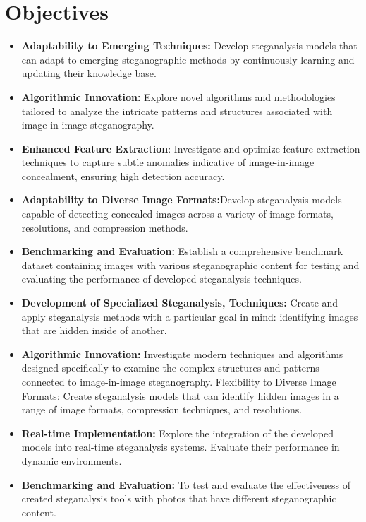\section{Objectives}
\begin{itemize}
\item \textbf{Adaptability to Emerging Techniques:} Develop steganalysis models that can adapt to emerging steganographic methods by continuously learning and updating their knowledge base.
\item \textbf{Algorithmic Innovation:} Explore novel algorithms and methodologies tailored to analyze the intricate patterns and structures associated with image-in-image steganography.
\item \textbf{Enhanced Feature Extraction}: Investigate and optimize feature extraction techniques to capture subtle anomalies indicative of image-in-image concealment, ensuring high detection accuracy.
\item \textbf{Adaptability to Diverse Image Formats:}Develop steganalysis models capable of detecting concealed images across a variety of image formats, resolutions, and compression methods.
\item \textbf{Benchmarking and Evaluation:} Establish a comprehensive benchmark dataset containing images with various steganographic content for testing and evaluating the performance of developed steganalysis techniques.
\item \textbf{Development of Specialized Steganalysis, Techniques:} Create and apply steganalysis methods with a particular goal in mind: identifying images that are hidden inside of another.
\item \textbf{Algorithmic Innovation:} Investigate modern techniques and algorithms designed specifically to examine the complex structures and patterns connected to image-in-image steganography.
Flexibility to Diverse Image Formats: Create steganalysis models that can identify hidden images in a range of image formats, compression techniques, and resolutions.
\item \textbf{Real-time Implementation:} Explore the integration of the developed models into real-time steganalysis systems. Evaluate their performance in dynamic environments.
\item \textbf{Benchmarking and Evaluation:} To test and evaluate the effectiveness of created steganalysis tools with photos that have different steganographic content.
\end{itemize}

